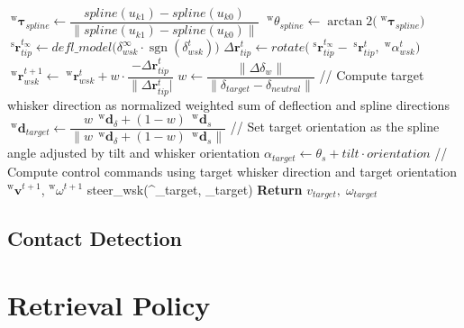\begin{algorithm}[htb]
\begin{algorithmic}
        \State \(\;^{\mathrm{w}}\boldsymbol{\tau}_{spline} \gets \dfrac{spline(u_{k1}) - spline(u_{k0})}{\|spline(u_{k1}) - spline(u_{k0})\|}\) 
        \State \(\;^{\mathrm{w}}\theta_{spline} \gets \arctan2\Big(\;^{\mathrm{w}}\boldsymbol{\tau}_{spline}\Big)\) 
        \State \(\;^{\mathrm{s}}\boldsymbol{r}_{tip}^{t_{\infty}} \gets defl\_model\Big(\delta_{wsk}^{\infty} \cdot \operatorname{sgn}(\delta_{wsk}^{t})\Big)\) 
        \State \(\Delta\boldsymbol{r}_{tip}^{t} \gets rotate\Big(\;^{\mathrm{s}}\boldsymbol{r}_{tip}^{t_{\infty}} - \;^{\mathrm{s}}\boldsymbol{r}_{tip}^{t},\; ^{\mathrm{w}}\alpha_{wsk}^{t}\Big)\) 
        \State \(\;^{\mathrm{w}}\boldsymbol{r}_{wsk}^{t+1} \gets \;^{\mathrm{w}}\boldsymbol{r}_{wsk}^{t} + w \cdot \dfrac{-\Delta\boldsymbol{r}_{tip}^{t}}{\|\Delta\boldsymbol{r}_{tip}^{t}|}\)
        \State \(w \gets \dfrac{\|\Delta\delta_w\|}{\|\delta_{target} - \delta_{neutral}\|}\)
        \State // Compute target whisker direction as normalized weighted sum of deflection and spline directions
        \State \(\;^{\mathrm{w}}\boldsymbol{d}_{target} \gets \dfrac{w\,\;^{\mathrm{w}}\boldsymbol{d}_\delta + (1-w)\,\;^{\mathrm{w}}\boldsymbol{d}_s}{\|w\,\;^{\mathrm{w}}\boldsymbol{d}_\delta + (1-w)\,\;^{\mathrm{w}}\boldsymbol{d}_s\|}\)
        \State // Set target orientation as the spline angle adjusted by tilt and whisker orientation
        \State \(\alpha_{target} \gets \theta_s + tilt \cdot orientation\)
        \State // Compute control commands using target whisker direction and target orientation
        \State \(^{\mathrm{w}}\boldsymbol{v}^{t+1}\), \(^{\mathrm{w}}\omega^{t+1}\) \gets steer\_wsk\big(\;^{}_{target},\; \alpha_{target}\big)\)
        \State \textbf{Return} \(v_{target},\; \omega_{target}\)
    \end{algorithmic}
    \label{alg:swiping_policy}
\end{algorithm}

\subsection{Contact Detection}


\section{Retrieval Policy}

